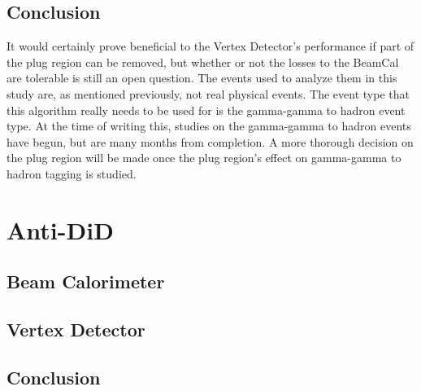 \documentclass{report}
\begin{document}
            \subsection{Conclusion} 
                 It would certainly prove beneficial to the Vertex Detector's performance if part of the plug region can be removed, but whether or not the losses to the BeamCal are tolerable is still an open question. The events used to analyze them in this study are, as mentioned previously, not real physical events. The event type that this algorithm really needs to be used for is the gamma-gamma to hadron event type. At the time of writing this, studies on the gamma-gamma to hadron events have begun, but are many months from completion. A more thorough decision on the plug region will be made once the plug region's effect on gamma-gamma to hadron tagging is studied.

        
        \section{Anti-DiD}
            \subsection{Beam Calorimeter}

            \subsection{Vertex Detector} 

            \subsection{Conclusion}







        
    
\end{document}
